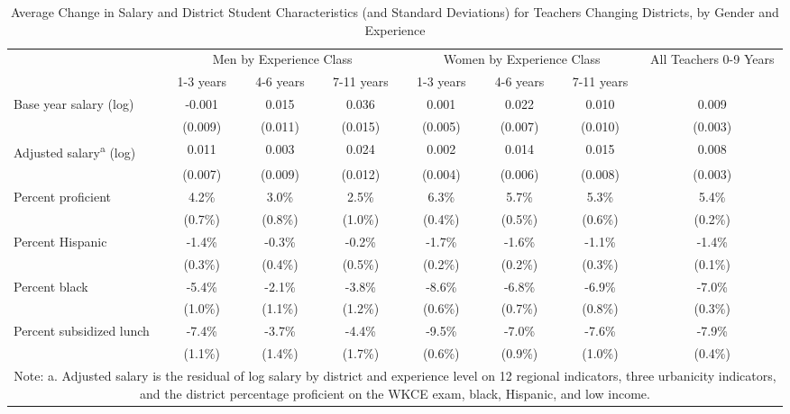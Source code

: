 \begin{sidewaystable}[htbp]
\centering
\begin{tabular}{lccccccc}
  \hline
 & \multicolumn{3}{c}{Men by Experience Class} & \multicolumn{3}{c}{Women by Experience Class} & \multirow{2}{*}{\parbox{0.1\linewidth}{All Teachers 0-9 Years}}\\ \cline{2-4} \cline{5-7}
 & 1-3 years & 4-6 years & 7-11 years & 1-3 years & 4-6 years & 7-11 years &  \\ 
  \hline
Base year salary (log) & -0.001 & 0.015 & 0.036 & 0.001 & 0.022 & 0.010 & 0.009 \\ 
   & (0.009) & (0.011) & (0.015) & (0.005) & (0.007) & (0.010) & (0.003) \\ 
  Adjusted salary\textsuperscript{a} (log) & 0.011 & 0.003 & 0.024 & 0.002 & 0.014 & 0.015 & 0.008 \\ 
   & (0.007) & (0.009) & (0.012) & (0.004) & (0.006) & (0.008) & (0.003) \\ 
  Percent proficient & 4.2\% & 3.0\% & 2.5\% & 6.3\% & 5.7\% & 5.3\% & 5.4\% \\ 
   & (0.7\%) & (0.8\%) & (1.0\%) & (0.4\%) & (0.5\%) & (0.6\%) & (0.2\%) \\ 
  Percent Hispanic & -1.4\% & -0.3\% & -0.2\% & -1.7\% & -1.6\% & -1.1\% & -1.4\% \\ 
   & (0.3\%) & (0.4\%) & (0.5\%) & (0.2\%) & (0.2\%) & (0.3\%) & (0.1\%) \\ 
  Percent black & -5.4\% & -2.1\% & -3.8\% & -8.6\% & -6.8\% & -6.9\% & -7.0\% \\ 
   & (1.0\%) & (1.1\%) & (1.2\%) & (0.6\%) & (0.7\%) & (0.8\%) & (0.3\%) \\ 
  Percent subsidized lunch & -7.4\% & -3.7\% & -4.4\% & -9.5\% & -7.0\% & -7.6\% & -7.9\% \\ 
   & (1.1\%) & (1.4\%) & (1.7\%) & (0.6\%) & (0.9\%) & (1.0\%) & (0.4\%) \\ 
   \hline
\multicolumn{8}{c}{\parbox{0.85\linewidth}{\scriptsize{Note: a. Adjusted salary is the residual of log salary by district and experience level on 12 regional indicators, three urbanicity indicators, and the district percentage proficient on the WKCE exam, black, Hispanic, and low income.}}}\\
\end{tabular}
\caption{Average Change in Salary and District Student Characteristics (and Standard Deviations) for Teachers Changing Districts, by Gender and Experience} 
\label{tbl:change_by_ge}
\end{sidewaystable}


